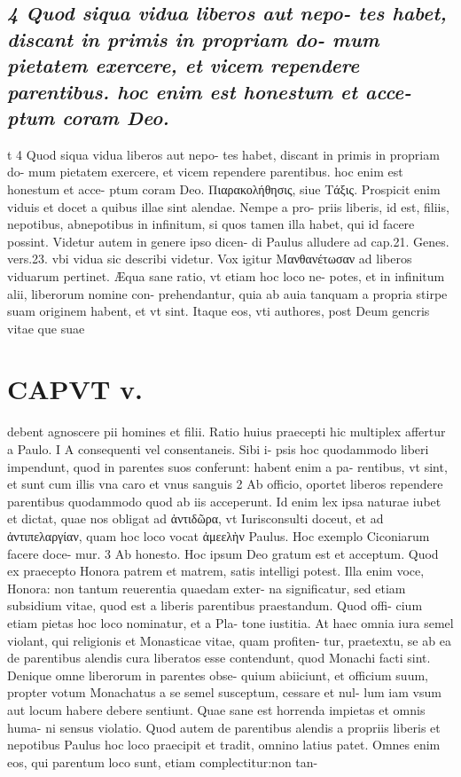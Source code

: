 \documentclass{article}
\begin{document}
\begin{pages}
\subsection*{\textit{4 Quod siqua vidua liberos aut nepo- tes habet, discant in primis in propriam do- mum pietatem exercere, et vicem rependere parentibus. hoc enim est honestum et acce- ptum coram Deo.}}t 4 Quod siqua vidua liberos aut nepo- tes habet, discant in primis in propriam do- mum pietatem exercere, et vicem rependere parentibus. hoc enim est honestum et acce- ptum coram Deo.  \pend\pstart Πιαρακολήθησις, siue Τάξις. Prospicit enim viduis et docet a quibus illae sint alendae. Nempe a pro- priis liberis, id est, filiis, nepotibus, abnepotibus in infinitum, si quos tamen illa habet, qui id facere possint. Videtur autem in genere ipso dicen- di Paulus alludere ad cap.21. Genes. vers.23. vbi vidua sic describi videtur. Vox igitur Μανθανέτωσαν ad liberos viduarum pertinet. Æqua sane ratio, vt etiam hoc loco ne- potes, et in infinitum alii, liberorum nomine con- prehendantur, quia ab auia tanquam a propria stirpe suam originem habent, et vt sint. Itaque eos, vti authores, post Deum gencris vitae que suae  \pend
\section*{CAPVT  v. }
\marginpar{[ p.255 ]}\pstart debent agnoscere pii homines et filii. Ratio huius praecepti hic multiplex affertur a Paulo. I A consequenti vel consentaneis. Sibi i- psis hoc quodammodo liberi impendunt, quod in parentes suos conferunt: habent enim a pa- rentibus, vt sint, et sunt cum illis vna caro et vnus sanguis 2 Ab officio, oportet liberos rependere parentibus quodammodo quod ab iis acceperunt. Id enim lex ipsa naturae iubet et dictat, quae nos obligat ad ἀντιδῶρα, vt Iurisconsulti doceut, et ad ἀντιπελαργίαν, quam hoc loco vocat ἀμεελὴν Paulus. Hoc exemplo Ciconiarum facere doce- mur. 3 Ab honesto. Hoc ipsum Deo gratum est et acceptum. Quod ex praecepto Honora patrem et matrem, satis intelligi potest. Illa enim voce, Honora: non tantum reuerentia quaedam exter- na significatur, sed etiam subsidium vitae, quod est a liberis parentibus praestandum. Quod offi- cium etiam pietas hoc loco nominatur, et a Pla- tone iustitia. At haec omnia iura semel violant, qui religionis et Monasticae vitae, quam profiten- tur, praetextu, se ab ea de parentibus alendis cura liberatos esse contendunt, quod Monachi facti sint. Denique omne liberorum in parentes obse- quium abiiciunt, et officium suum, propter votum Monachatus a se semel susceptum, cessare et nul- lum iam vsum aut locum habere debere sentiunt. Quae sane est horrenda impietas et omnis huma- ni sensus violatio. Quod autem de parentibus alendis a propriis liberis et nepotibus Paulus hoc loco praecipit et tradit, omnino latius patet. Omnes enim eos, qui parentum loco sunt, etiam complectitur:non tan-  \pend

\end{pages}
\end{document}
